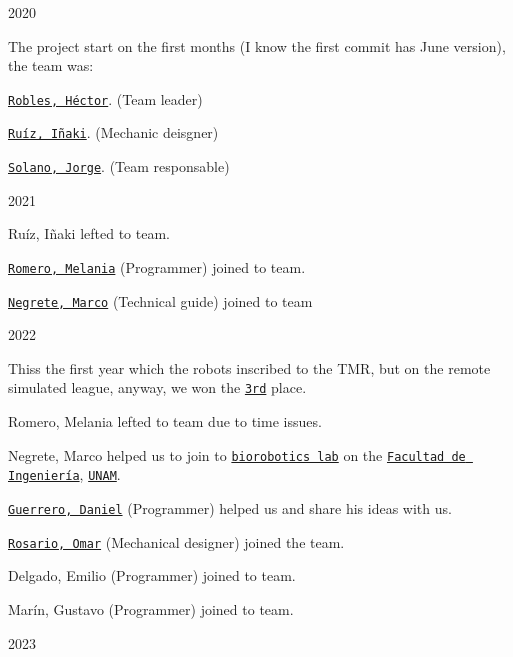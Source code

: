 \begin{DoxyItemize}
\item 2020
\begin{DoxyItemize}
\item The project start on the first months (I know the first commit has June version), the team was\+:
\item \href{https://github.com/Hector290601}{\tt Robles, Héctor}. (Team leader)
\item \href{https://github.com/Ricardo-Inaqui}{\tt Ruíz, Iñaki}. (Mechanic deisgner)
\item \href{https://github.com/jrg-sln}{\tt Solano, Jorge}. (Team responsable)
\end{DoxyItemize}
\item 2021
\begin{DoxyItemize}
\item Ruíz, Iñaki lefted to team.
\item \href{https://github.com/melaniaromero}{\tt Romero, Melania} (Programmer) joined to team.
\item \href{https://github.com/mnegretev}{\tt Negrete, Marco} (Technical guide) joined to team
\end{DoxyItemize}
\item 2022
\begin{DoxyItemize}
\item This\textquotesingle{}s the first year which the robot\textquotesingle{}s inscribed to the T\+MR, but on the remote simulated league, anyway, we won the \href{https://femexrobotica.org/tmr2022/resultados/}{\tt 3rd} place.
\item Romero, Melania lefted to team due to time issues.
\item Negrete, Marco helped us to join to \href{https://biorobotics.fi-p.unam.mx/es/}{\tt biorobotics lab} on the \href{https://www.ingenieria.unam.mx/}{\tt Facultad de Ingeniería}, \href{https://www.unam.mx/}{\tt U\+N\+AM}.
\item \href{https://github.com/danguer3}{\tt Guerrero, Daniel} (Programmer) helped us and share his ideas with us.
\item \href{https://github.com/OmarRosCar}{\tt Rosario, Omar} (Mechanical designer) joined the team.
\item Delgado, Emilio (Programmer) joined to team.
\item Marín, Gustavo (Programmer) joined to team.
\end{DoxyItemize}
\item 2023
\begin{DoxyItemize}

\end{DoxyItemize}
\end{DoxyItemize}
